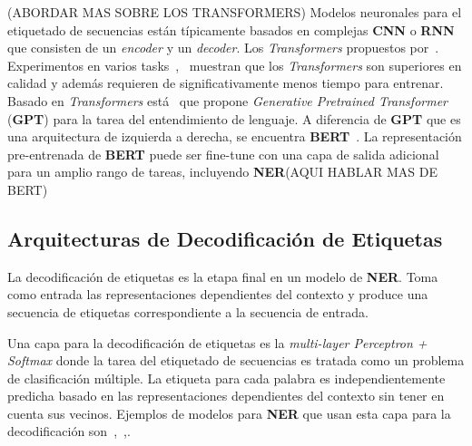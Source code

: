 (ABORDAR MAS SOBRE LOS TRANSFORMERS)
Modelos neuronales para el etiquetado de secuencias est\'an t\'ipicamente basados en complejas \textbf{CNN} o \textbf{RNN} que consisten de un \emph{encoder} y un \emph{decoder}. Los \emph{Transformers} propuestos por~\cite{vaswani2017attention}. Experimentos en varios tasks~\cite{kitaev2018constituency},~\cite{liu2018generating} muestran que los \emph{Transformers} son superiores en calidad y adem\'as requieren de significativamente menos tiempo para entrenar. Basado en \emph{Transformers} est\'a~\cite{radford2018improving} que propone \emph{Generative Pretrained Transformer} (\textbf{GPT}) para la tarea del entendimiento de lenguaje. A diferencia de \textbf{GPT} que es una arquitectura de izquierda a derecha, se encuentra \textbf{BERT}~\cite{devlin2018bert}. La representaci\'on pre-entrenada de \textbf{BERT} puede ser fine-tune con una capa de salida adicional para un amplio rango de tareas, incluyendo \textbf{NER}(AQUI HABLAR MAS DE BERT)

\subsection{Arquitecturas de Decodificaci\'on de Etiquetas}

La decodificaci\'on de etiquetas es la etapa final en un modelo de \textbf{NER}. Toma como entrada las representaciones dependientes del contexto y produce una secuencia de etiquetas correspondiente a la secuencia de entrada.

Una capa para la decodificaci\'on de etiquetas es la \emph{multi-layer Perceptron + Softmax} donde la tarea del etiquetado de secuencias es tratada como un problema de clasificaci\'on m\'ultiple. La etiqueta para cada palabra es independientemente predicha basado en las representaciones dependientes del contexto sin tener en cuenta sus vecinos. Ejemplos de modelos para \textbf{NER} que usan esta capa para la decodificaci\'on son~\cite{strubell2017fast},~\cite{li2017leveraging},\cite{xu2017local}.


